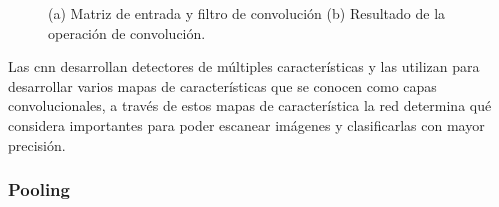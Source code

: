 \begin{figure}[htbp]
\centering
{}%

\caption{(a) Matriz de entrada y filtro de convolución (b) Resultado de la operación de convolución.}\label{Fig:filter}
\end{figure}


Las \ac{cnn} desarrollan detectores de múltiples características y las utilizan para desarrollar varios mapas de características que se conocen como capas convolucionales, a través de estos mapas de característica la red determina qué  considera importantes para poder escanear imágenes y clasificarlas con mayor precisión.
\subsubsection{Pooling}\label{sub:pooling}

